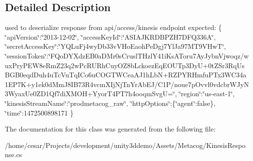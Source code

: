 \subsection{Detailed Description}
used to deserialize response from api/access/kinesis endpoint expected\+: \{ \char`\"{}api\+Version\char`\"{}\+:\char`\"{}2013-\/12-\/02\char`\"{}, \char`\"{}access\+Key\+Id\char`\"{}\+:\char`\"{}\+A\+S\+I\+A\+J\+K\+R\+D\+B\+P\+Z\+H7\+D\+F\+Q336\+A\char`\"{}, \char`\"{}secret\+Access\+Key\char`\"{}\+:\char`\"{}\+Y\+Q\+Lu\+Fj4wy\+Db33v\+V\+Ho\+Eaoh\+Pe\+Dgj7\+Yl\+Ja97\+M\+T9\+V\+Hw\+T\char`\"{}, \char`\"{}session\+Token\char`\"{}\+:\char`\"{}\+F\+Qo\+D\+Y\+Xdz\+E\+B0a\+D\+Mr0s\+Crusl\+T\+Hzl\+Y41i\+Ks\+A\+Toru7\+Ay\+Jybn\+Vjwoqz/wux\+Pry\+P\+E\+W8e\+Rm\+Z23q2w\+Pc\+R\+U\+Rh\+Cuy\+O\+Z8b\+Lckoez\+Eq\+E\+O\+U\+Tp3\+Dy\+U+0t\+Z\+Sr3\+Rq\+Us\+B\+G\+B0eqd\+Duh4u\+Tc\+Vu\+Tq\+I\+Co6u\+C\+O\+G\+T\+W\+Cea\+A\+J1h\+Lb\+N+\+R\+Z\+P\+Y\+R\+Hmfu\+P\+Tx3\+W\+C34a1\+E\+P7\+K+y1ek0d\+Mm\+J8\+I\+B73\+R4vcm\+X\+Ij\+Nj\+Tn\+Yr\+Ab\+E\+J/\+C1\+P/noue7p\+Ovvl0vdcbr\+W\+Jy\+N3\+Wyax\+Ue0\+Z\+D1\+Qf7di\+X\+M\+O\+H+\+Yyor\+T4\+P\+T7h4ooqm\+Svg\+U=\char`\"{}, \char`\"{}region\char`\"{}\+:\char`\"{}us-\/east-\/1\char`\"{}, \char`\"{}kinesis\+Stream\+Name\char`\"{}\+:\char`\"{}prodmetacog\+\_\+raw\char`\"{}, \char`\"{}http\+Options\char`\"{}\+:\{\char`\"{}agent\char`\"{}\+:false\}, \char`\"{}time\char`\"{}\+:1472500898171 \} 

The documentation for this class was generated from the following file\+:\begin{DoxyCompactItemize}
\item 
/home/cesar/\+Projects/development/unity3ddemo/\+Assets/\+Metacog/Kinesis\+Response.\+cs\end{DoxyCompactItemize}
